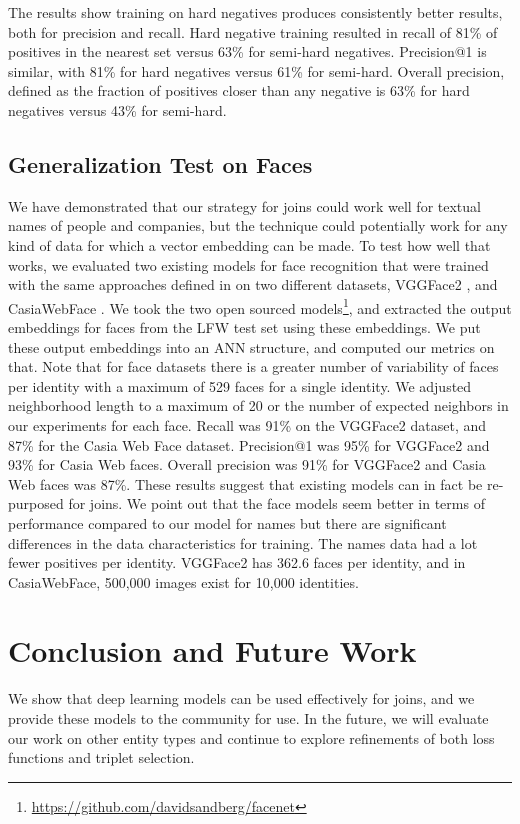  The results show training on hard negatives produces consistently better results, both for precision and recall.  Hard negative training resulted in recall of 81\% of positives in the nearest set versus 63\% for semi-hard negatives.  Precision@1 is similar, with 81\% for hard negatives versus 61\% for semi-hard.  Overall precision, defined as the fraction of positives closer than any negative is 63\% for hard negatives versus 43\% for semi-hard.

\subsection{Generalization Test on Faces}
We have demonstrated that our strategy for joins could work well for textual names of people and companies, but the technique could potentially work for any kind of data for which a vector embedding can be made.  To test how well that works, we evaluated two existing models for face recognition that were trained with the same approaches defined in \cite{DBLP:conf/cvpr/SchroffKP15} on two different datasets, VGGFace2 \cite{DBLP:conf/fgr/CaoSXPZ18}, and CasiaWebFace \cite{DBLP:journals/corr/YiLLL14a}.  We took the two open sourced models\footnote{\url{https://github.com/davidsandberg/facenet}}, and extracted the output embeddings for faces from the LFW test set \cite{Huang2012a} using these embeddings.  We put these output embeddings into an ANN structure, and computed our metrics on that.  Note that for face datasets there is a greater number of variability of faces per identity with a maximum of 529 faces for a single identity.  We adjusted neighborhood length to a maximum of 20 or the number of expected neighbors in our experiments for each face.  Recall was 91\% on the VGGFace2 dataset, and 87\% for the Casia Web Face dataset.  Precision@1 was 95\% for VGGFace2 and 93\% for Casia Web faces.  Overall precision was 91\% for VGGFace2 and Casia Web faces was 87\%.  These results suggest that existing models can in fact be re-purposed for joins.  We point out that the face models seem better in terms of performance compared to our model for names but there are significant differences in the data characteristics for training.  The names data had a lot fewer positives per identity.  VGGFace2 has 362.6 faces per identity, and in CasiaWebFace, 500,000 images exist for 10,000 identities.

\section{Conclusion and Future Work}
We show that deep learning models can be used effectively for joins, and we provide these models to the community for use.  In the future, we will evaluate our work on other entity types and continue to explore refinements of both loss functions and triplet selection.

